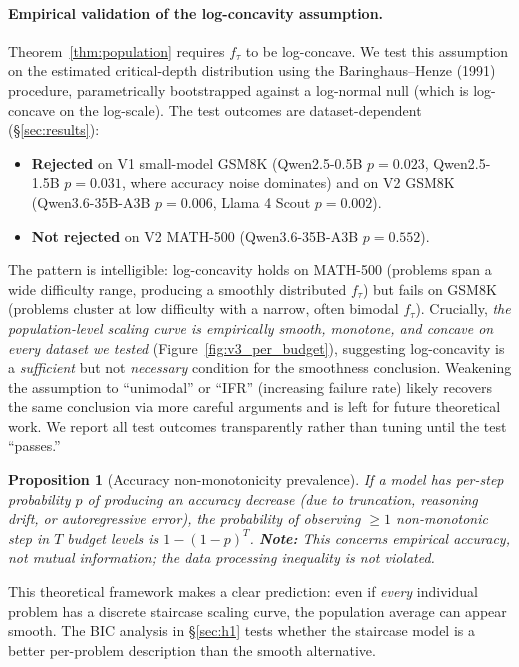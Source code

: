 \documentclass{article}
\newtheorem{proposition}{Proposition}
\begin{document}
\paragraph{Empirical validation of the log-concavity assumption.}
Theorem~\ref{thm:population} requires $f_\tau$ to be log-concave.  We test this assumption on the estimated critical-depth distribution using the Baringhaus--Henze (1991) procedure, parametrically bootstrapped against a log-normal null (which is log-concave on the log-scale).  The test outcomes are dataset-dependent (\S\ref{sec:results}):
\begin{itemize}[leftmargin=*,itemsep=0pt]
    \item \textbf{Rejected} on V1 small-model GSM8K (Qwen2.5-0.5B $p{=}0.023$, Qwen2.5-1.5B $p{=}0.031$, where accuracy noise dominates) and on V2 GSM8K (Qwen3.6-35B-A3B $p{=}0.006$, Llama 4 Scout $p{=}0.002$).
    \item \textbf{Not rejected} on V2 MATH-500 (Qwen3.6-35B-A3B $p{=}0.552$).
\end{itemize}
The pattern is intelligible: log-concavity holds on MATH-500 (problems span a wide difficulty range, producing a smoothly distributed $f_\tau$) but fails on GSM8K (problems cluster at low difficulty with a narrow, often bimodal $f_\tau$).  Crucially, \emph{the population-level scaling curve is empirically smooth, monotone, and concave on every dataset we tested} (Figure~\ref{fig:v3_per_budget}), suggesting log-concavity is a \emph{sufficient} but not \emph{necessary} condition for the smoothness conclusion.  Weakening the assumption to ``unimodal'' or ``IFR'' (increasing failure rate) likely recovers the same conclusion via more careful arguments and is left for future theoretical work.  We report all test outcomes transparently rather than tuning until the test ``passes.''

\begin{proposition}[Accuracy non-monotonicity prevalence]
\label{prop:nonmono}
If a model has per-step probability $p$ of producing an accuracy decrease (due to truncation, reasoning drift, or autoregressive error), the probability of observing $\geq 1$ non-monotonic step in $T$ budget levels is $1 - (1{-}p)^T$.  \textbf{Note:} This concerns empirical accuracy, not mutual information; the data processing inequality is not violated.
\end{proposition}

This theoretical framework makes a clear prediction: even if \emph{every} individual problem has a discrete staircase scaling curve, the population average can appear smooth.  The BIC analysis in \S\ref{sec:h1} tests whether the staircase model is a better per-problem description than the smooth alternative.
\end{document}
